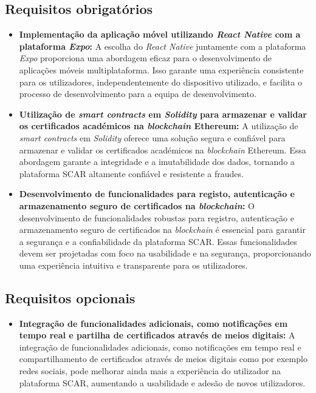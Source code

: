 \documentclass[10pt]{article}
\begin{document}
\subsection*{Requisitos obrigatórios}

\begin{itemize}

    \item\textbf{Implementação da aplicação móvel utilizando \textit{React Native} com a plataforma \textit{Expo}:} A escolha do \textit{React Native}
          juntamente com a plataforma \textit{Expo} proporciona uma abordagem eficaz para o desenvolvimento de aplicações móveis
          multiplataforma. Isso garante uma experiência consistente para os utilizadores, independentemente do dispositivo
          utilizado, e facilita o processo de desenvolvimento para a equipa de desenvolvimento.

    \item\textbf{Utilização de \textit{smart contracts}  em \textit{Solidity} para armazenar e validar os certificados académicos na \textit{blockchain}
              Ethereum:} A utilização de \textit{smart contracts} em \textit{Solidity} oferece uma solução segura e confiável para armazenar
          e validar os certificados académicos na \textit{blockchain} Ethereum. Essa abordagem garante a integridade e a
          imutabilidade dos dados, tornando a plataforma SCAR altamente confiável e resistente a fraudes.

    \item\textbf{Desenvolvimento de funcionalidades para registo, autenticação e armazenamento seguro de certificados na
              \textit{blockchain}:} O desenvolvimento de funcionalidades robustas para registro, autenticação e armazenamento seguro
          de certificados na \textit{blockchain} é essencial para garantir a segurança e a confiabilidade da plataforma SCAR.\@
          Essas funcionalidades devem ser projetadas com foco na usabilidade e na segurança, proporcionando uma
          experiência intuitiva e transparente para os utilizadores.

\end{itemize}

\subsection*{Requisitos opcionais}

\begin{itemize}

    \item\textbf{Integração de funcionalidades adicionais, como notificações em tempo real e partilha de certificados
              através de meios digitais:} A integração de funcionalidades adicionais, como notificações em tempo real e
          compartilhamento de certificados através de meios digitais como por exemplo redes sociais, pode melhorar ainda mais a experiência do
          utilizador na plataforma SCAR, aumentando a usabilidade e adesão de novos utilizadores.

\end{itemize}
\end{document}

